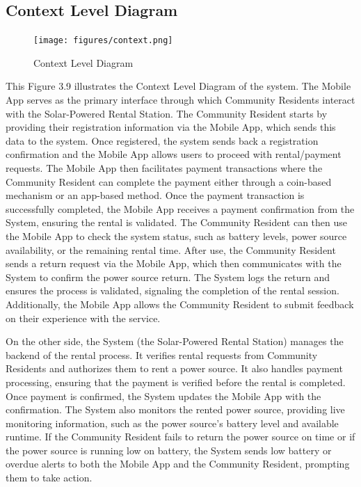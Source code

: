 {\subsection{Context Level Diagram}

\begin{figure}[H]
	\centering
	\caption{Context Level Diagram}
	\label{fig:context level diagram}
	\texttt{[image: figures/context.png]}
\end{figure}

This Figure 3.9 illustrates the Context Level Diagram of the system. The Mobile App serves as the primary interface through which Community Residents interact with the Solar-Powered Rental Station. The Community Resident starts by providing their registration information via the Mobile App, which sends this data to the system. Once registered, the system sends back a registration confirmation and the Mobile App allows users to proceed with rental/payment requests. The Mobile App then facilitates payment transactions where the Community Resident can complete the payment either through a coin-based mechanism or an app-based method. Once the payment transaction is successfully completed, the Mobile App receives a payment confirmation from the System, ensuring the rental is validated. The Community Resident can then use the Mobile App to check the system status, such as battery levels, power source availability, or the remaining rental time. After use, the Community Resident sends a return request via the Mobile App, which then communicates with the System to confirm the power source return. The System logs the return and ensures the process is validated, signaling the completion of the rental session. Additionally, the Mobile App allows the Community Resident to submit feedback on their experience with the service.

On the other side, the System (the Solar-Powered Rental Station) manages the backend of the rental process. It verifies rental requests from Community Residents and authorizes them to rent a power source. It also handles payment processing, ensuring that the payment is verified before the rental is completed. Once payment is confirmed, the System updates the Mobile App with the confirmation. The System also monitors the rented power source, providing live monitoring information, such as the power source’s battery level and available runtime. If the Community Resident fails to return the power source on time or if the power source is running low on battery, the System sends low battery or overdue alerts to both the Mobile App and the Community Resident, prompting them to take action. 

}
